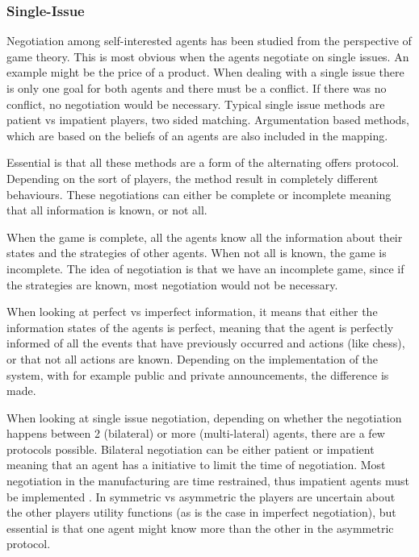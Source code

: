 \subsubsection{Single-Issue}

Negotiation among self-interested agents has been studied from the perspective of game theory. This is most obvious when the agents negotiate on single issues. An example might be the price of a product. When dealing with a single issue there is only one goal for both agents and there must be a conflict. If there was no conflict, no negotiation would be necessary. Typical single issue methods are patient vs impatient players, two sided matching. Argumentation based methods, which are based on the beliefs of an agents are also included in the mapping.

Essential is that all these methods are a form of the alternating offers protocol. Depending on the sort of players, the method result in completely different behaviours. These negotiations can either be complete or incomplete meaning that all information is known, or not all. 

When the game is complete, all the agents know all the information about their states and the strategies of other agents. When not all is known, the game is incomplete. The idea of negotiation is that we have an incomplete game, since if the strategies are known, most negotiation would not be necessary.

When looking at perfect vs imperfect information, it means that either the information states of the agents is perfect, meaning that the agent is perfectly informed of all the events that have previously occurred and actions (like chess), or that not all actions are known. Depending on the implementation of the system, with for example public and private announcements, the difference is made. 

When looking at single issue negotiation, depending on whether the negotiation happens between 2 (bilateral) or more (multi-lateral) agents, there are a few protocols possible. Bilateral negotiation can be either patient or impatient \citep{fatima2014negotiation} meaning that an agent has a initiative to limit the time of negotiation. Most negotiation in the manufacturing are time restrained, thus impatient agents must be implemented \citep{kraus1995multiagent}. In symmetric vs asymmetric the players are uncertain about the other players utility functions (as is the case in imperfect negotiation), but essential is that one agent might know more than the other in the asymmetric protocol.

